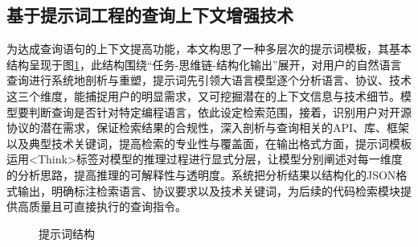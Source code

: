 \documentclass[UTF8,a4paper,12pt]{ctexart}
\numberwithin{equation}{section}
\begin{document}
\subsection{基于提示词工程的查询上下文增强技术}
为达成查询语句的上下文提高功能，本文构思了一种多层次的提示词模板，其基本结构呈现于图\ref{prompt1}，此结构围绕“任务-思维链-结构化输出”展开，对用户的自然语言查询进行系统地剖析与重塑，提示词先引领大语言模型逐个分析语言、协议、技术这三个维度，能捕捉用户的明显需求，又可挖掘潜在的上下文信息与技术细节。模型要判断查询是否针对特定编程语言，依此设定检索范围，接着，识别用户对开源协议的潜在需求，保证检索结果的合规性，深入剖析与查询相关的API、库、框架以及典型技术关键词，提高检索的专业性与覆盖面，在输出格式方面，提示词模板运用<Think>标签对模型的推理过程进行显式分层，让模型分别阐述对每一维度的分析思路，提高推理的可解释性与透明度。系统把分析结果以结构化的JSON格式输出，明确标注检索语言、协议要求以及技术关键词，为后续的代码检索模块提供高质量且可直接执行的查询指令。\par
\begin{figure}[H]
	\caption{提示词结构}
	\label{prompt1}
\end{figure}
\end{document}
